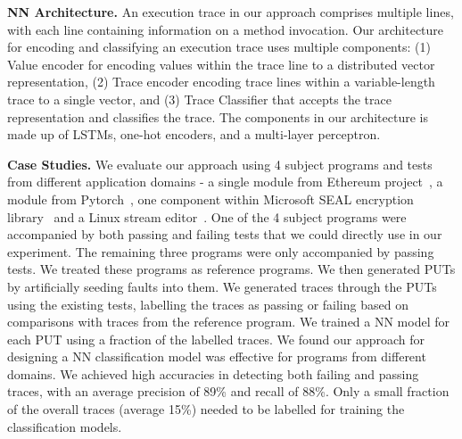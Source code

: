 



\textbf{NN Architecture.} 
An execution trace in our approach comprises multiple lines, with each line containing information on a method invocation. 
Our architecture for encoding and classifying an execution trace uses multiple components: (1) Value encoder for encoding values within the trace line to a distributed vector representation, (2) Trace encoder encoding trace lines within a variable-length trace to a single vector, and (3) Trace Classifier that accepts the trace representation and classifies the trace. The components in our architecture is made up of LSTMs, one-hot encoders, and a multi-layer perceptron. 

\textbf{Case Studies.} We evaluate our approach using 4 subject programs and tests from different application domains - a single module from Ethereum project~\cite{ethereum}, a module from Pytorch~\cite{pytorch}, one component within Microsoft SEAL encryption library~\cite{sealcrypto} and a Linux stream editor~\cite{sed}.  
One of the 4 subject programs were accompanied by both passing and failing tests that we could directly use in our experiment. The remaining three programs were only accompanied by passing tests. We treated these programs as reference programs. We then generated PUTs by artificially seeding faults into them. We generated traces through the PUTs using the existing tests, labelling the traces as passing or failing based on comparisons with traces from the reference program.  We trained a NN model for each PUT using a fraction of the labelled traces. We found our approach for designing a NN classification model was effective for programs from different domains. We achieved high accuracies in detecting both failing and passing traces, with an average precision of 89\% and recall of 88\%. Only a small fraction of the overall traces (average 15\%) needed to be labelled for training the classification models.

